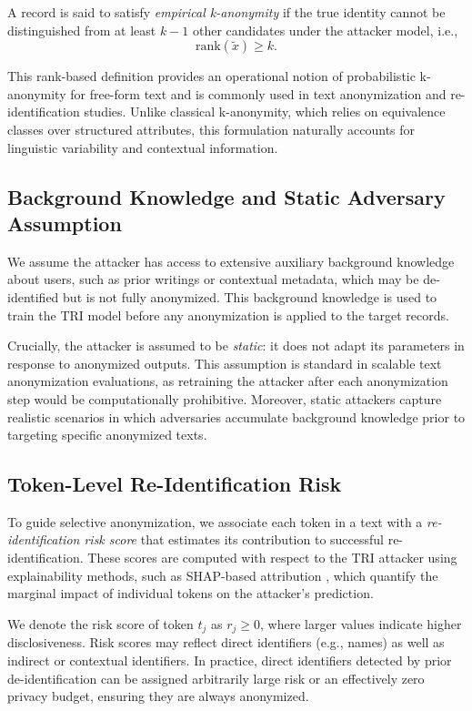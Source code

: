 \documentclass[10pt, a4paper]{article}
\begin{document}
A record is said to satisfy \emph{empirical k-anonymity} if the true identity cannot be distinguished from at least $k-1$ other candidates under the attacker model, i.e.,
\[
\mathrm{rank}(\tilde{x}) \geq k.
\]

This rank-based definition provides an operational notion of probabilistic k-anonymity for free-form text and is commonly used in text anonymization and re-identification studies. Unlike classical k-anonymity, which relies on equivalence classes over structured attributes, this formulation naturally accounts for linguistic variability and contextual information.

\subsection{Background Knowledge and Static Adversary Assumption}

We assume the attacker has access to extensive auxiliary background knowledge about users, such as prior writings or contextual metadata, which may be de-identified but is not fully anonymized. This background knowledge is used to train the TRI model before any anonymization is applied to the target records.

Crucially, the attacker is assumed to be \emph{static}: it does not adapt its parameters in response to anonymized outputs. This assumption is standard in scalable text anonymization evaluations, as retraining the attacker after each anonymization step would be computationally prohibitive. Moreover, static attackers capture realistic scenarios in which adversaries accumulate background knowledge prior to targeting specific anonymized texts.

\subsection{Token-Level Re-Identification Risk}

To guide selective anonymization, we associate each token in a text with a \emph{re-identification risk score} that estimates its contribution to successful re-identification. These scores are computed with respect to the TRI attacker using explainability methods, such as SHAP-based attribution \cite{lundberg_unified_2017}, which quantify the marginal impact of individual tokens on the attacker’s prediction.

We denote the risk score of token $t_j$ as $r_j \geq 0$, where larger values indicate higher disclosiveness. Risk scores may reflect direct identifiers (e.g., names) as well as indirect or contextual identifiers. In practice, direct identifiers detected by prior de-identification can be assigned arbitrarily large risk or an effectively zero privacy budget, ensuring they are always anonymized.
\end{document}
